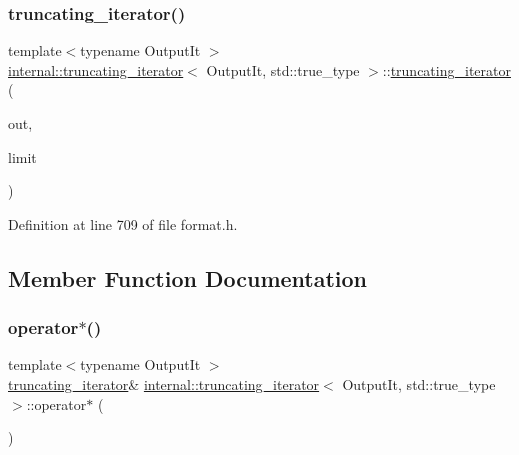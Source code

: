 \subsubsection{\texorpdfstring{truncating\+\_\+iterator()}{truncating\_iterator()}}
{\footnotesize\ttfamily template$<$typename Output\+It $>$ \\
\hyperlink{classinternal_1_1truncating__iterator}{internal\+::truncating\+\_\+iterator}$<$ Output\+It, std\+::true\+\_\+type $>$\+::\hyperlink{classinternal_1_1truncating__iterator}{truncating\+\_\+iterator} (\begin{DoxyParamCaption}\item[{Output\+It}]{out,  }\item[{std\+::size\+\_\+t}]{limit }\end{DoxyParamCaption})\hspace{0.3cm}{\ttfamily [inline]}}



Definition at line 709 of file format.\+h.



\subsection{Member Function Documentation}
\mbox{\label{classinternal_1_1truncating__iterator_3_01_output_it_00_01std_1_1true__type_01_4_abe59e545d0c6bb7097296a96133f5517}} 
\subsubsection{\texorpdfstring{operator$\ast$()}{operator*()}}
{\footnotesize\ttfamily template$<$typename Output\+It $>$ \\
\hyperlink{classinternal_1_1truncating__iterator}{truncating\+\_\+iterator}\& \hyperlink{classinternal_1_1truncating__iterator}{internal\+::truncating\+\_\+iterator}$<$ Output\+It, std\+::true\+\_\+type $>$\+::operator$\ast$ (\begin{DoxyParamCaption}{ }\end{DoxyParamCaption})\hspace{0.3cm}{\ttfamily [inline]}}



